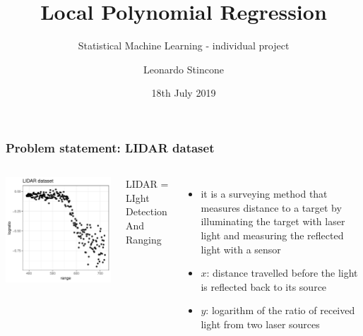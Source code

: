 \documentclass[pdf]{beamer}\usepackage[]{graphicx}\usepackage[]{color}
\title{Local Polynomial Regression}
\subtitle{Statistical Machine Learning - individual project}
\author{Leonardo Stincone}
\date{18th July 2019}
\institute[units]{Università degli Studi di Trieste}
\makeatletter
\def\maxwidth{ %
  \ifdim\Gin@nat@width>\linewidth
    \linewidth
  \else
    \Gin@nat@width
  \fi
}
\newenvironment{knitrout}{}{} %
\makeatother
\begin{document}
\begin{frame}
\titlepage
\end{frame}






\begin{frame}
\frametitle{Problem statement: LIDAR dataset}



\begin{columns}
\begin{knitrout}
\color{fgcolor}

{\centering \includegraphics[width=\maxwidth]{figure/lidarPlot-1} 

}



\end{knitrout}
\small LIDAR = LIght Detection And Ranging
\begin{itemize}
\item it is a surveying method that measures distance to a target by illuminating the target with laser light and measuring the reflected light with a sensor
\item $x$: distance travelled before the light is reflected back to its source
\item $y$: logarithm of the ratio of received light from two laser sources
\end{itemize}
\end{columns}


\end{frame}
\end{document}
